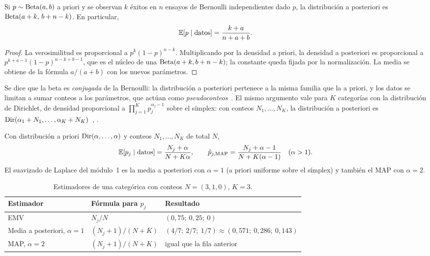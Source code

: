 \begin{teorema}\label{teo:beta}
Si $p\sim\operatorname{Beta}(a,b)$ a priori y se observan $k$ éxitos en $n$ ensayos de Bernoulli independientes dado $p$, la distribución a posteriori es $\operatorname{Beta}(a+k,\,b+n-k)$. En particular,
\[
\mathbb{E}[p\mid\text{datos}]=\frac{k+a}{n+a+b}.
\]
\end{teorema}

\begin{proof}
La verosimilitud es proporcional a $p^{k}(1-p)^{n-k}$. Multiplicando por la densidad a priori, la densidad a posteriori es proporcional a $p^{k+a-1}(1-p)^{n-k+b-1}$, que es el núcleo de una $\operatorname{Beta}(a+k,b+n-k)$; la constante queda fijada por la normalización. La media se obtiene de la fórmula $a/(a+b)$ con los nuevos parámetros.
\end{proof}

Se dice que la beta es \emph{conjugada} de la Bernoulli: la distribución a posteriori pertenece a la misma familia que la a priori, y los datos se limitan a sumar conteos a los parámetros, que actúan como \emph{pseudoconteos}~\cite[clase~15]{mit1805}. El mismo argumento vale para $K$ categorías con la distribución de Dirichlet, de densidad proporcional a $\prod_{j=1}^{K}p_j^{\alpha_j-1}$ sobre el símplex: con conteos $N_1,\dots,N_K$, la distribución a posteriori es $\operatorname{Dir}(\alpha_1+N_1,\dots,\alpha_K+N_K)$~\cite[§2.2.1]{bishop}, \cite[§6.6]{mml}.

\begin{corolario}\label{cor:laplace}
Con distribución a priori $\operatorname{Dir}(\alpha,\dots,\alpha)$ y conteos $N_1,\dots,N_K$ de total $N$,
\[
\mathbb{E}[p_j\mid\text{datos}]=\frac{N_j+\alpha}{N+K\alpha},\qquad
\hat p_{j,\mathrm{MAP}}=\frac{N_j+\alpha-1}{N+K(\alpha-1)}\quad(\alpha>1).
\]
El suavizado de Laplace del módulo~1 es la media a posteriori con $\alpha=1$ (a priori uniforme sobre el símplex) y también el MAP con $\alpha=2$.
\end{corolario}

\begin{table}[h]
\centering\small
\caption{Estimadores de una categórica con conteos $N=(3,1,0)$, $K=3$.}\label{tab:estimadores}
\begin{tabular}{@{}lll@{}}
\toprule
Estimador & Fórmula para $p_j$ & Resultado \\
\midrule
EMV & $N_j/N$ & $(0{,}75;\ 0{,}25;\ 0)$ \\
Media a posteriori, $\alpha=1$ & $(N_j+1)/(N+K)$ & $(4/7;\ 2/7;\ 1/7)\approx(0{,}571;\ 0{,}286;\ 0{,}143)$ \\
MAP, $\alpha=2$ & $(N_j+1)/(N+K)$ & igual que la fila anterior \\
\bottomrule
\end{tabular}
\end{table}

